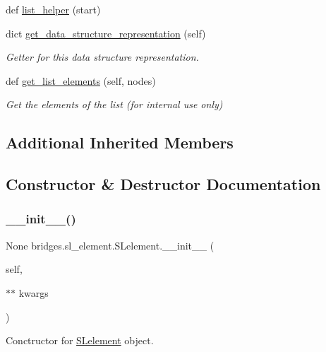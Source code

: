 \begin{DoxyCompactItemize}
$$def \mbox{\hyperlink{classbridges_1_1sl__element_1_1_s_lelement_a7aaed085f18082fab6d027ca014130ca}{list\+\_\+helper}} (start)
\item 
dict \mbox{\hyperlink{classbridges_1_1sl__element_1_1_s_lelement_adcf1fd38e95d8bbcfa64dac7262c0285}{get\+\_\+data\+\_\+structure\+\_\+representation}} (self)
\begin{DoxyCompactList}\small\item\em Getter for this data structure representation. \end{DoxyCompactList}\item 
def \mbox{\hyperlink{classbridges_1_1sl__element_1_1_s_lelement_ad3b94c8e7540aca841e6306c190e1be1}{get\+\_\+list\+\_\+elements}} (self, nodes)
\begin{DoxyCompactList}\small\item\em Get the elements of the list (for internal use only) \end{DoxyCompactList}\end{DoxyCompactItemize}
\subsection*{Additional Inherited Members}


\subsection{Constructor \& Destructor Documentation}
\mbox{\label{classbridges_1_1sl__element_1_1_s_lelement_a0824caaa305931953bf3f6d53d3a3d14}} 
\subsubsection{\texorpdfstring{\_\_init\_\_()}{\_\_init\_\_()}}
{\footnotesize\ttfamily  None bridges.\+sl\+\_\+element.\+S\+Lelement.\+\_\+\+\_\+init\+\_\+\+\_\+ (\begin{DoxyParamCaption}\item[{}]{self,  }\item[{$\ast$$\ast$}]{kwargs }\end{DoxyParamCaption})}



Conctructor for \mbox{\hyperlink{classbridges_1_1sl__element_1_1_s_lelement}{S\+Lelement}} object. 


